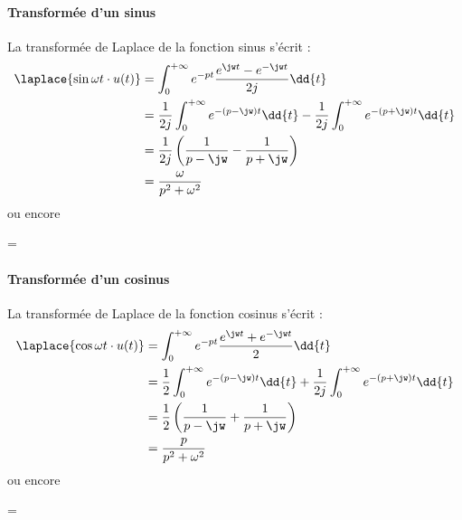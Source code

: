 \paragraph{Transformée d'un sinus}
La transformée de Laplace de la fonction sinus s'écrit :
\begin{align*}
\laplace{\sin{\omega t}\cdot u(t)}&=
\int_{0}^{+\infty}e^{-pt}\dfrac{e^{\jw t}-e^{-\jw t}}{2j}\dd{t}\\
&=\dfrac{1}{2j}\int_{0}^{+\infty}e^{-(p-\jw)t}\dd{t} - 
  \dfrac{1}{2j}\int_{0}^{+\infty}e^{-(p+\jw)t}\dd{t} \\
&=\dfrac{1}{2j}\left( \dfrac{1}{p-\jw}-\dfrac{1}{p+\jw}\right)\\
&=\dfrac{\omega}{p^2+\omega^2}
\end{align*}
ou encore
\begin{bequation}
    =
\end{bequation}
\paragraph{Transformée d'un cosinus}
La transformée de Laplace de la fonction cosinus s'écrit :
\begin{align*}
\laplace{\cos{\omega t}\cdot u(t)}&=\int_{0}^{+\infty}e^{-pt}
\dfrac{e^{\jw t}+e^{-\jw t}}{2}\dd{t}\\
&=\dfrac{1}{2}\int_{0}^{+\infty}e^{-(p-\jw)t}\dd{t} + 
\dfrac{1}{2j}\int_{0}^{+\infty}e^{-(p+\jw)t}\dd{t} \\
&=\dfrac{1}{2}\left( \dfrac{1}{p-\jw}+\dfrac{1}{p+\jw}\right)\\
&=\dfrac{p}{p^2+\omega^2}
\end{align*}
ou encore
\begin{bequation}
    =
\end{bequation}
\newpage
{}
\captionsetup{width=0.9\linewidth}
